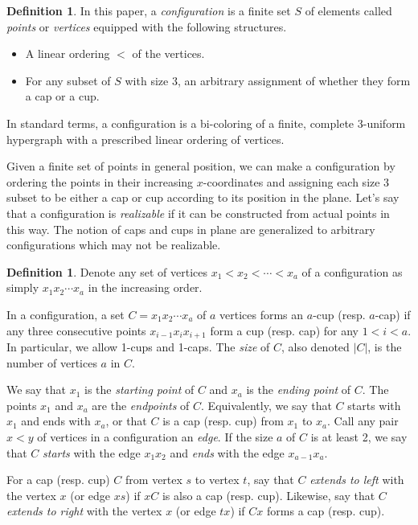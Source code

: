 \documentclass{amsart}
\theoremstyle{definition}
\newtheorem{definition}[thm]{Definition}
\numberwithin{thm}{section}
\begin{document}
\begin{definition}
In this paper, a \emph{configuration} is a finite set $S$ of elements called \emph{points} or \emph{vertices} equipped with the following structures.
\begin{itemize}
	\item A linear ordering $<$ of the vertices.
	\item For any subset of $S$ with size 3, an arbitrary assignment of whether they form a cap or a cup.
\end{itemize}
In standard terms, a configuration is a bi-coloring of a finite, complete 3-uniform hypergraph with a prescribed linear ordering of vertices.
\end{definition}

Given a finite set of points in general position, we can make a configuration by ordering the points in their increasing $x$-coordinates and assigning each size 3 subset to be either a cap or cup according to its position in the plane.
Let's say that a configuration is \emph{realizable} if it can be constructed from actual points in this way.
The notion of caps and cups in plane are generalized to arbitrary configurations which may not be realizable.
\begin{definition}
Denote any set of vertices $x_1 < x_2 < \cdots < x_a$ of a configuration as simply $x_1x_2\cdots x_a$ in the increasing order. 

In a configuration, a set $C = x_1x_2 \cdots x_a$ of $a$ vertices forms an $a$-cup (resp. $a$-cap) if any three consecutive points $x_{i-1} x_i x_{i+1}$ form a cup (resp. cap)  for any $1 < i < a$.
In particular, we allow 1-cups and 1-caps.
The \emph{size} of $C$, also denoted $|C|$, is the number of vertices $a$ in $C$.

We say that $x_1$ is the \emph{starting point} of $C$ and $x_a$ is the \emph{ending point} of $C$.
The points $x_1$ and $x_a$ are the \emph{endpoints} of $C$.
Equivalently, we say that $C$ starts with $x_1$ and ends with $x_a$, or that $C$ is a cap (resp. cup) from $x_1$ to $x_a$.
Call any pair $x < y$ of vertices in a configuration an \emph{edge}.
If the size $a$ of $C$ is at least 2, we say that $C$ \emph{starts} with the edge $x_1x_2$ and \emph{ends} with the edge $x_{a-1}x_a$.

For a cap (resp. cup) $C$ from vertex $s$ to vertex $t$, say that $C$ \emph{extends to left} with the vertex $x$ (or edge $xs$) if $xC$ is also a cap (resp. cup).
Likewise, say that $C$ \emph{extends to right} with the vertex $x$ (or edge $tx$) if $Cx$ forms a cap (resp. cup).
\end{definition}
\end{document}
